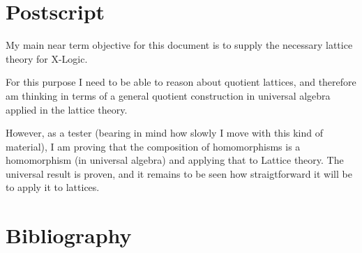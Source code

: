 
\section{Postscript}\label{POSTSCRIPT}

My main near term objective for this document is to supply the necessary lattice theory for X-Logic.

For this purpose I need to be able to reason about quotient lattices, and therefore am thinking in terms of a general quotient construction in universal algebra applied in the lattice theory.

However, as a tester (bearing in mind how slowly I move with this kind of material), I am proving that the composition of homomorphisms is a homomorphism (in universal algebra) and applying that to Lattice theory.
The universal result is proven, and it remains to be seen how straigtforward it will be to apply it to lattices.

\appendix

\vfill




\pagebreak

\section*{Bibliography}\label{BIBLIOGRAPHY}

{\def\section*#1{\ignore{#1}}
\raggedright


} %

{
{\small\printindex}}



